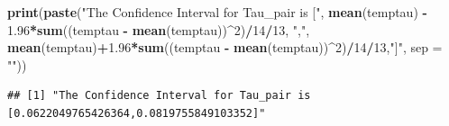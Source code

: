 \documentclass[]{article}
\newenvironment{Shaded}{\begin{snugshade}}{\end{snugshade}}
\newcommand{\KeywordTok}[1]{\textcolor[rgb]{0.13,0.29,0.53}{\textbf{#1}}}
\newcommand{\DataTypeTok}[1]{\textcolor[rgb]{0.13,0.29,0.53}{#1}}
\newcommand{\DecValTok}[1]{\textcolor[rgb]{0.00,0.00,0.81}{#1}}
\newcommand{\FloatTok}[1]{\textcolor[rgb]{0.00,0.00,0.81}{#1}}
\newcommand{\StringTok}[1]{\textcolor[rgb]{0.31,0.60,0.02}{#1}}
\newcommand{\OperatorTok}[1]{\textcolor[rgb]{0.81,0.36,0.00}{\textbf{#1}}}
\newcommand{\NormalTok}[1]{#1}
\begin{document}
\begin{Shaded}
\begin{Highlighting}[]
\KeywordTok{print}\NormalTok{(}\KeywordTok{paste}\NormalTok{(}\StringTok{"The Confidence Interval for Tau_pair is ["}\NormalTok{, }\KeywordTok{mean}\NormalTok{(temptau) }\OperatorTok{-}\StringTok{ }\FloatTok{1.96}\OperatorTok{*}\KeywordTok{sum}\NormalTok{((temptau }\OperatorTok{-}\StringTok{ }\KeywordTok{mean}\NormalTok{(temptau))}\OperatorTok{^}\DecValTok{2}\NormalTok{)}\OperatorTok{/}\DecValTok{14}\OperatorTok{/}\DecValTok{13}\NormalTok{, }\StringTok{","}\NormalTok{, }\KeywordTok{mean}\NormalTok{(temptau)}\OperatorTok{+}\FloatTok{1.96}\OperatorTok{*}\KeywordTok{sum}\NormalTok{((temptau }\OperatorTok{-}\StringTok{ }\KeywordTok{mean}\NormalTok{(temptau))}\OperatorTok{^}\DecValTok{2}\NormalTok{)}\OperatorTok{/}\DecValTok{14}\OperatorTok{/}\DecValTok{13}\NormalTok{,}\StringTok{"]"}\NormalTok{, }\DataTypeTok{sep =} \StringTok{""}\NormalTok{))}
\end{Highlighting}
\end{Shaded}

\begin{verbatim}
## [1] "The Confidence Interval for Tau_pair is [0.0622049765426364,0.0819755849103352]"
\end{verbatim}
\end{document}
